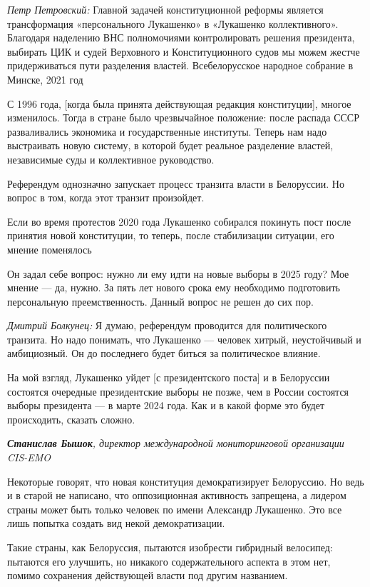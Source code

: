 \textit{Петр Петровский:} Главной задачей конституционной реформы является трансформация «персонального Лукашенко» в «Лукашенко коллективного». Благодаря наделению ВНС полномочиями контролировать решения президента, выбирать ЦИК и судей Верховного и Конституционного судов мы можем жестче придерживаться пути разделения властей.
Всебелорусское народное собрание в Минске, 2021 год

С 1996 года, [когда была принята действующая редакция конституции], многое изменилось. Тогда в стране было чрезвычайное положение: после распада СССР разваливались экономика и государственные институты. Теперь нам надо выстраивать новую систему, в которой будет реальное разделение властей, независимые суды и коллективное руководство.

Референдум однозначно запускает процесс транзита власти в Белоруссии. Но вопрос в том, когда этот транзит произойдет.


\begin{fancyquotes}
    Если во время протестов 2020 года Лукашенко собирался покинуть пост после принятия новой конституции, то теперь, после стабилизации ситуации, его мнение поменялось
\end{fancyquotes}

Он задал себе вопрос: нужно ли ему идти на новые выборы в 2025 году? Мое мнение — да, нужно. За пять лет нового срока ему необходимо подготовить персональную преемственность. Данный вопрос не решен до сих пор.


\textit{Дмитрий Болкунец:} Я думаю, референдум проводится для политического транзита. Но надо понимать, что Лукашенко — человек хитрый, неустойчивый и амбициозный. Он до последнего будет биться за политическое влияние.

На мой взгляд, Лукашенко уйдет [с президентского поста] и в Белоруссии состоятся очередные президентские выборы не позже, чем в России состоятся выборы президента — в марте 2024 года. Как и в какой форме это будет происходить, сказать сложно.

\textit{\textbf{Станислав Бышок}, директор международной мониторинговой организации CIS-EMO}

Некоторые говорят, что новая конституция демократизирует Белоруссию. Но ведь и в старой не написано, что оппозиционная активность запрещена, а лидером страны может быть только человек по имени Александр Лукашенко. Это все лишь попытка создать вид некой демократизации.

Такие страны, как Белоруссия, пытаются изобрести гибридный велосипед: пытаются его улучшить, но никакого содержательного аспекта в этом нет, помимо сохранения действующей власти под другим названием.

